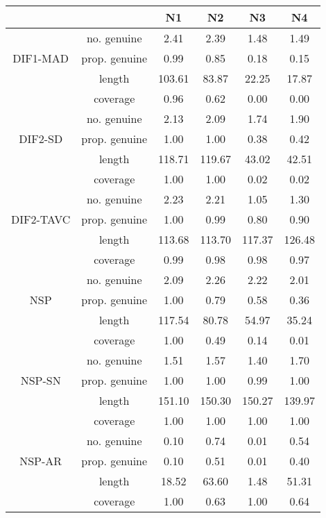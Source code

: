 \begin{tabular}{|c|c|c|c|c|c|}
  \hline
 &  & N1 & N2 & N3 & N4 \\ 
  \hline
 & no. genuine & 2.41 & 2.39 & 1.48 & 1.49 \\ 
  DIF1-MAD & prop. genuine & 0.99 & 0.85 & 0.18 & 0.15 \\ 
   & length & 103.61 & 83.87 & 22.25 & 17.87 \\ 
   & coverage & 0.96 & 0.62 & 0.00 & 0.00 \\ 
   & no. genuine & 2.13 & 2.09 & 1.74 & 1.90 \\ 
  DIF2-SD & prop. genuine & 1.00 & 1.00 & 0.38 & 0.42 \\ 
   & length & 118.71 & 119.67 & 43.02 & 42.51 \\ 
   & coverage & 1.00 & 1.00 & 0.02 & 0.02 \\ 
   & no. genuine & 2.23 & 2.21 & 1.05 & 1.30 \\ 
  DIF2-TAVC & prop. genuine & 1.00 & 0.99 & 0.80 & 0.90 \\ 
   & length & 113.68 & 113.70 & 117.37 & 126.48 \\ 
   & coverage & 0.99 & 0.98 & 0.98 & 0.97 \\ 
   & no. genuine & 2.09 & 2.26 & 2.22 & 2.01 \\ 
  NSP & prop. genuine & 1.00 & 0.79 & 0.58 & 0.36 \\ 
   & length & 117.54 & 80.78 & 54.97 & 35.24 \\ 
   & coverage & 1.00 & 0.49 & 0.14 & 0.01 \\ 
   & no. genuine & 1.51 & 1.57 & 1.40 & 1.70 \\ 
  NSP-SN & prop. genuine & 1.00 & 1.00 & 0.99 & 1.00 \\ 
   & length & 151.10 & 150.30 & 150.27 & 139.97 \\ 
   & coverage & 1.00 & 1.00 & 1.00 & 1.00 \\ 
   & no. genuine & 0.10 & 0.74 & 0.01 & 0.54 \\ 
  NSP-AR & prop. genuine & 0.10 & 0.51 & 0.01 & 0.40 \\ 
   & length & 18.52 & 63.60 & 1.48 & 51.31 \\ 
   & coverage & 1.00 & 0.63 & 1.00 & 0.64 \\ 
   \hline
\end{tabular}
